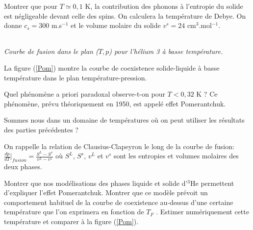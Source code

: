 \question
Montrer que pour $T \simeq 0,1$ K, la contribution des phonons à l'entropie du solide est
négligeable devant celle des spins. On calculera la température de Debye. On donne $c_s=300$ m.s$^{-1}$ et le volume molaire du solide $v^s = 24$ cm$^3$.mol$^{-1}$.



\begin{center} \\
\textit{Courbe de fusion dans le plan ($T, p$) pour l'hélium 3 à basse température.}
\label{Pom}
\end{center}

La figure (\ref{Pom}) montre la courbe de coexistence solide-liquide à basse température dans le plan température-pression.

\question
Quel phénomène a priori paradoxal observe-t-on pour $T < 0,32$ K ? Ce phénomène, prévu théoriquement en 1950, est appelé \og effet Pomerantchuk\fg.

\question
Sommes nous dans un domaine de températures où on peut utiliser les résultats des parties précédentes ?

On rappelle la relation de Clausius-Clapeyron le long de la courbe de fusion: $\frac{dp}{dT}\vert_{fusion}=\frac{S^L-S^s}{v^L-v^s}$ où $S^L$, $S^s$, $v^L$ et $v^s$ sont les entropies et volumes molaires des deux phases.

\question
Montrer que nos modélisations des phases liquide et solide d'$^3$He permettent d'expliquer l'effet
Pomerantchuk. Montrer  que ce modèle prévoit un comportement habituel de la courbe de coexistence au-dessus d'une certaine température que l'on exprimera en fonction de $T_F$ . Estimer numériquement cette température et comparer à la figure (\ref{Pom}).
